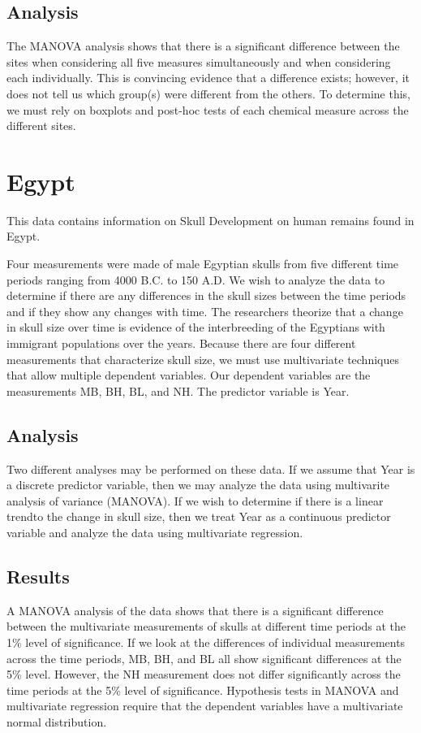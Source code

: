 \documentclass[11pt]{article} %
\begin{document}
\bigskip
\subsection{Analysis}
The MANOVA analysis shows that there is a significant difference between the sites when considering all five measures simultaneously and when considering each individually. This is convincing evidence that a difference exists; however, it does not tell us which group(s) were different from the others. To determine this, we must rely on boxplots and post-hoc tests of each chemical measure across the different sites.

\newpage

\section{Egypt}

This data contains information on Skull Development on human remains found in Egypt.


\bigskip


 Four measurements were made of male Egyptian skulls from five different time periods ranging from 4000 B.C. to 150 A.D. We wish to analyze the data to determine if there are any differences in the skull sizes between the time periods and if they show any changes with time. The researchers theorize that a change in skull size over time is evidence of the interbreeding of the Egyptians with immigrant populations over the years.
Because there are four different measurements that characterize skull size, we must use multivariate techniques that allow multiple dependent variables. Our dependent variables are the measurements MB, BH, BL, and NH. The predictor variable is Year.


\bigskip

\subsection{Analysis}
Two different analyses may be performed on these data. If we assume that Year is a discrete predictor variable, then we may analyze the data using multivarite analysis of variance (MANOVA). If we wish to determine if there is a linear trendto the change in skull size, then we treat Year as a continuous predictor variable and analyze the data using multivariate regression.


\bigskip

\subsection{Results}
A MANOVA analysis of the data shows that there is a significant difference between the multivariate measurements of skulls at different time periods at the 1\% level of significance. If we look at the differences of individual measurements across the time periods, MB, BH, and BL all show significant differences at the 5\% level. However, the NH measurement does not differ significantly across the time periods at the 5\% level of significance.
Hypothesis tests in MANOVA and multivariate regression require that the dependent variables have a multivariate normal distribution. 
\end{document}
